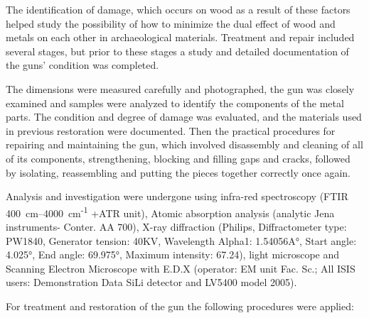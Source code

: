 The identification of damage, which occurs on wood as a result of these factors helped study the possibility of how to minimize the dual effect of wood and metals on each other in archaeological materials. Treatment and repair included several stages, but prior to these stages a study and detailed documentation of the guns’ condition was completed. 

The dimensions were measured carefully and photographed, the gun was closely examined and samples were analyzed to identify the components of the metal parts. The condition and degree of damage was evaluated, and the materials used in previous restoration were documented. Then the practical procedures for repairing and maintaining the gun, which involved disassembly and cleaning of all of its components, strengthening, blocking and filling gaps and cracks, followed by isolating, reassembling and putting the pieces together correctly once again.



Analysis  and investigation were undergone using infra-red spectroscopy (FTIR \SIrange[range-phrase=--]{400}{4000}{\centi\metre}\textsuperscript{-1} +ATR unit), Atomic absorption analysis (analytic Jena instruments- Conter. AA 700), X-ray diffraction (Philips, Diffractometer type: PW1840, Generator tension: 40KV, Wavelength Alpha1: 1.54056A°, Start angle: \ang{4.025}, End angle: \ang{69.975}, Maximum intensity: 67.24), light microscope and Scanning Electron Microscope with E.D.X (operator: EM unit Fac. Sc.; All ISIS users: Demonstration Data SiLi detector and LV5400 model 2005).


For  treatment and restoration of the gun the following procedures were applied:

